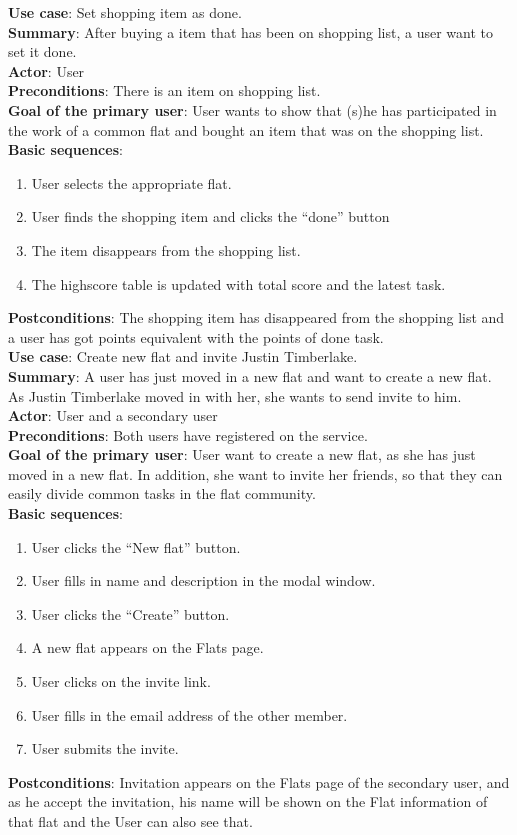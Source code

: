 \documentclass{sig-alt-release2}
\begin{document}
\textbf{Use case}: Set shopping item as done. \\
\textbf{Summary}: After buying a item that has been on shopping list, a user want to set it done. \\
\textbf{Actor}: User \\
\textbf{Preconditions}: There is an item on shopping list. \\
\textbf{Goal of the primary user}: User wants to show that (s)he has participated in the work of a common flat and bought an item that was on the shopping list. \\
\textbf{Basic sequences}:
\begin{enumerate}
\item User selects the appropriate flat.
\item User finds the shopping item and clicks the “done” button
\item The item disappears from the shopping list.
\item The highscore table is updated with total score and the latest task.
\end{enumerate}
\textbf{Postconditions}: The shopping item has disappeared from the shopping list and a user has got points equivalent with the points of done task. \\

\textbf{Use case}: Create new flat and invite Justin Timberlake. \\
\textbf{Summary}: A user has just moved in a new flat and want to create a new flat. As Justin Timberlake moved in with her, she wants to send invite to him. \\
\textbf{Actor}: User and a secondary user \\
\textbf{Preconditions}: Both users have registered on the service.  \\
\textbf{Goal of the primary user}: User want to create a new flat, as she has just moved in a new flat. In addition, she want to invite her friends, so that they can easily divide common tasks in the flat community. \\
\textbf{Basic sequences}:
\begin{enumerate}
\item User clicks the {“}New flat{”} button.
\item User fills in name and description in the modal window.
\item User clicks the {“}Create{”} button.
\item A new flat appears on the Flats page.
\item User clicks on the invite link.
\item User fills in the email address of the other member.
\item User submits the invite.
\end{enumerate}
\textbf{Postconditions}: Invitation appears on the Flats page of the secondary user, and as he accept the invitation, his name will be shown on the Flat information of that flat and the User can also see that. \\
\end{document}
